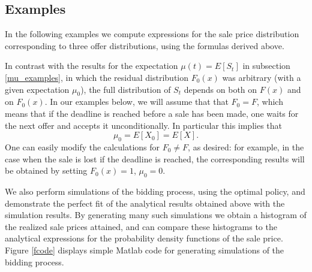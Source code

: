 \documentclass{article}
\numberwithin{equation}{section}
\begin{document}
\subsection{Examples}
\label{examples_distribution}

In the following examples we 
compute expressions for the sale price distribution 
corresponding to three offer distributions, using the formulas derived above.

In contrast with the results for the 
expectation $\mu(t)=E[S_t]$ in subsection 
\ref{mu_examples}, in which the residual
distribution $F_0(x)$ was arbitrary (with a given expectation $\mu_0$), the full  distribution of $S_t$ depends 
on both on $F(x)$ and on $F_0(x)$.
In our examples below, we will assume that
that $F_0=F$, which means that if the deadline is reached before a sale has been made, one waits for the next offer and accepts it unconditionally. In particular this implies that
$$\mu_0=E[X_0]=E[X].$$
One can easily modify the calculations for $F_0\neq F$, as desired: for example, in the case when the sale is lost if the deadline is reached, the corresponding results will be obtained by setting $F_0(x)=1$, $\mu_0=0$.

We also perform simulations of the bidding process, using
the optimal policy, and demonstrate 
the perfect fit of the analytical results obtained above with the simulation results. By generating many such
simulations we obtain a histogram of the realized sale prices 
attained, and can compare these histograms to the 
analytical expressions for the probability density 
functions of the sale price. Figure \ref{fcode} displays simple Matlab code for
generating simulations of the bidding process.

%
%		
%		
%		
%		
%		
%		
\end{document}
